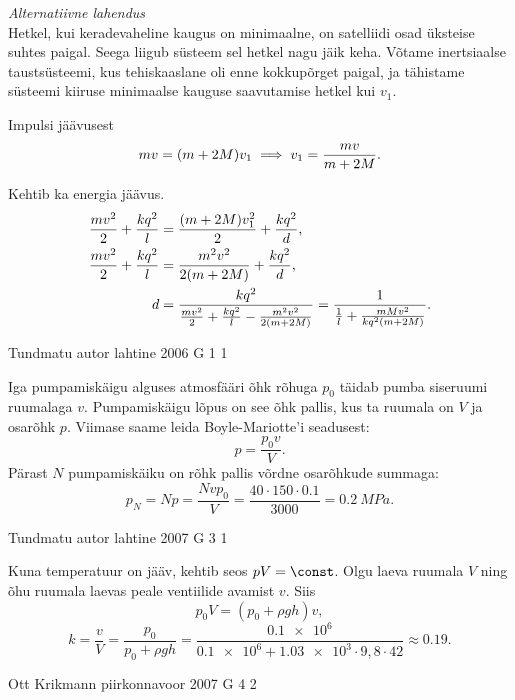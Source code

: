 \documentclass[11pt]{article}
\begin{document}
{{\vspace{0.5\baselineskip}

\emph{Alternatiivne lahendus}\\
Hetkel, kui keradevaheline kaugus on minimaalne, on satelliidi osad üksteise
suhtes paigal. Seega liigub süsteem sel hetkel nagu jäik keha. Võtame
inertsiaalse taustsüsteemi, kus tehiskaaslane oli enne kokkupõrget paigal, ja
tähistame süsteemi kiiruse minimaalse kauguse saavutamise hetkel kui $v_1$.

Impulsi jäävusest
\[ m v = (m+2M) v_1 \implies v_1 = \frac{m v}{m+2M}\text. \]

Kehtib ka energia jäävus.
\begin{align*}
\frac{m v^2}{2} + \frac{k q^2}{l} &= \frac{(m+2M) v_1^2}{2} + \frac{k q^2}{d}
\text, \\
\frac{m v^2}{2} + \frac{k q^2}{l} &= \frac{m^2 v^2}{2 (m+2M)} + \frac{k q^2}{d}
\text, \\
d &= \frac{k q^2}{\frac{m v^2}{2} + \frac{k q^2}{l} - \frac{m^2 v^2}{2 (m+2M)}}
= \frac{1}{\frac{1}{l} + \frac{m M v^2}{k q^2 (m+2M)}} \text.
\end{align*}
\fi
}

{Tundmatu autor} %
{lahtine} %
{2006} %
{G 1} %
{1} %
{

\ifSolution
Iga pumpamiskäigu alguses atmosfääri õhk rõhuga $p_0$ täidab pumba siseruumi ruumalaga $v$. Pumpamiskäigu lõpus on see õhk pallis, kus ta ruumala on $V$ ja osarõhk $p$. Viimase saame leida Boyle-Mariotte’i seadusest:
\[
p = \frac{p_0v}{V}.
\]
Pärast $N$ pumpamiskäiku on rõhk pallis võrdne osarõhkude summaga:
\[
p_{N}=N p=\frac{N v p_{0}}{V}=\frac{40 \cdot 150 \cdot \num{0,1}}{3000}=\SI{0,2}{MPa}.
\]
\fi
}

{Tundmatu autor} %
{lahtine} %
{2007} %
{G 3} %
{1} %
{

\ifSolution
Kuna temperatuur on jääv, kehtib seos $pV = \const$. Olgu laeva ruumala $V$ ning õhu ruumala laevas peale ventiilide avamist $v$. Siis
\[
p_{0} V=\left(p_{0}+\rho g h\right) v,
\]
\[
k=\frac{v}{V}=\frac{p_{0}}{p_{0}+\rho g h}=\frac{\num{0,1e6}}{\num{0,1e6}+\num{1,03e3} \cdot 9,8 \cdot 42} \approx \num{0,19}.
\]
\fi
}

{Ott Krikmann} %
{piirkonnavoor} %
{2007} %
{G 4} %
{2} %
{

}}
\end{document}
